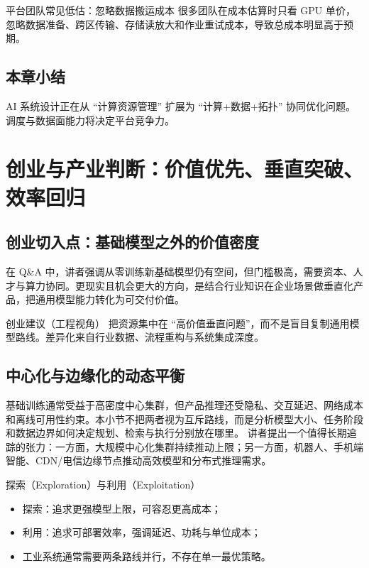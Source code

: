 \documentclass[a4paper]{article}
\begin{document}
\begin{warningbox}{平台团队常见低估：忽略数据搬运成本}
很多团队在成本估算时只看 GPU 单价，忽略数据准备、跨区传输、存储读放大和作业重试成本，导致总成本明显高于预期。
\end{warningbox}

\subsection{本章小结}
AI 系统设计正在从 ``计算资源管理'' 扩展为 ``计算+数据+拓扑'' 协同优化问题。调度与数据面能力将决定平台竞争力。

\section{创业与产业判断：价值优先、垂直突破、效率回归}

\subsection{创业切入点：基础模型之外的价值密度}
在 Q\&A 中，讲者强调从零训练新基础模型仍有空间，但门槛极高，需要资本、人才与算力协同。更现实且机会更大的方向，是结合行业知识在企业场景做垂直化产品，把通用模型能力转化为可交付价值。

\begin{importantbox}{创业建议（工程视角）}
把资源集中在 ``高价值垂直问题''，而不是盲目复制通用模型路线。差异化来自行业数据、流程重构与系统集成深度。
\end{importantbox}

\subsection{中心化与边缘化的动态平衡}
基础训练通常受益于高密度中心集群，但产品推理还受隐私、交互延迟、网络成本和离线可用性约束。本小节不把两者视为互斥路线，而是分析模型大小、任务阶段和数据边界如何决定规划、检索与执行分别放在哪里。
讲者提出一个值得长期追踪的张力：一方面，大规模中心化集群持续推动上限；另一方面，机器人、手机端智能、CDN/电信边缘节点推动高效模型和分布式推理需求。

\begin{knowledgebox}{探索（Exploration）与利用（Exploitation）}
\begin{itemize}
    \item 探索：追求更强模型上限，可容忍更高成本；
    \item 利用：追求可部署效率，强调延迟、功耗与单位成本；
    \item 工业系统通常需要两条路线并行，不存在单一最优策略。
\end{itemize}
\end{knowledgebox}
\end{document}
